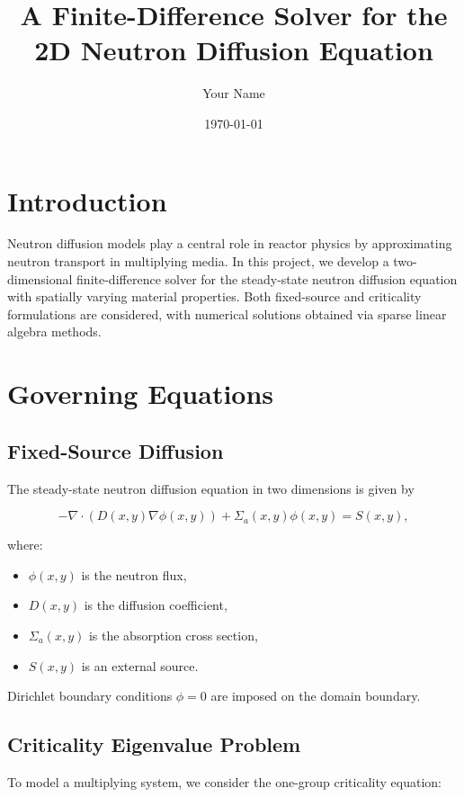 \documentclass[11pt]{article}
\title{A Finite-Difference Solver for the 2D Neutron Diffusion Equation}
\author{Your Name}
\date{\today}
\begin{document}
\maketitle

\section{Introduction}

Neutron diffusion models play a central role in reactor physics by approximating neutron transport in multiplying media. In this project, we develop a two-dimensional finite-difference solver for the steady-state neutron diffusion equation with spatially varying material properties. Both fixed-source and criticality formulations are considered, with numerical solutions obtained via sparse linear algebra methods.

\section{Governing Equations}

\subsection{Fixed-Source Diffusion}

The steady-state neutron diffusion equation in two dimensions is given by

\begin{equation}
- \nabla \cdot (D(x,y) \nabla \phi(x,y)) + \Sigma_a(x,y)\phi(x,y) = S(x,y),
\end{equation}

where:
\begin{itemize}
    \item $\phi(x,y)$ is the neutron flux,
    \item $D(x,y)$ is the diffusion coefficient,
    \item $\Sigma_a(x,y)$ is the absorption cross section,
    \item $S(x,y)$ is an external source.
\end{itemize}

Dirichlet boundary conditions $\phi = 0$ are imposed on the domain boundary.

\subsection{Criticality Eigenvalue Problem}

To model a multiplying system, we consider the one-group criticality equation:
\end{document}
